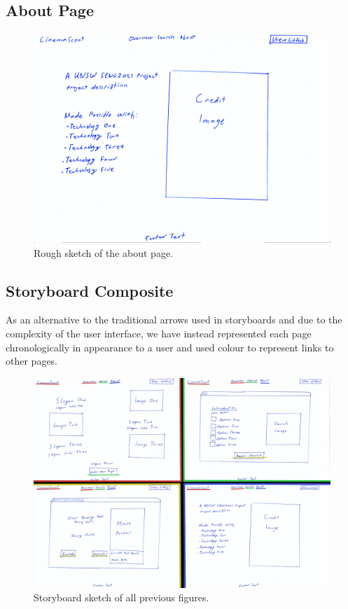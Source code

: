 \documentclass{article}
\begin{document}
\subsection{About Page}
\begin{figure}[H]
\includegraphics[width=\columnwidth]{res/credits.jpg}
\caption{Rough sketch of the about page.}
\end{figure}
\subsection{Storyboard Composite}
As an alternative to the traditional arrows used in storyboards and due to the
complexity of the user interface, we have instead represented each page
chronologically in appearance to a user and used colour to represent links
to other pages.
\begin{figure}[H]
\includegraphics[width=\columnwidth]{res/arrows.png}
\caption{Storyboard sketch of all previous figures.}
\end{figure}
\end{document}
